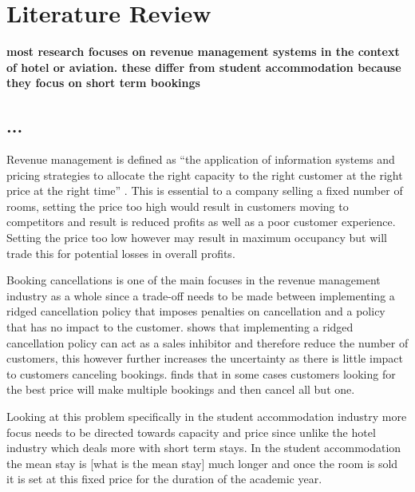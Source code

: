 \chapter{Literature Review}
\label{ch:lit_rev}

\textbf{most research focuses on revenue management systems in the context of hotel or aviation. these differ from student accommodation because they focus on short term bookings}

\section{...}
Revenue management is defined as “the application of information systems and pricing strategies to allocate the right capacity to the right customer at the right price at the right time” \cite{Kimes2003HasAcceptable}. This is essential to a company selling a fixed number of rooms, setting the price too high would result in customers  moving to competitors and result is reduced profits as well as a poor customer experience. Setting the price too low however may result in maximum occupancy but will trade this for potential losses in overall profits.

\vspace{5mm}

Booking cancellations is one of the main focuses in the revenue management industry as a whole \cite{Subramanian1999AirlineNo-shows} since a trade-off needs to be made between implementing a ridged cancellation policy that imposes penalties on cancellation and a policy that has no impact to the customer. \cite{Jinhong2007ServiceCancellations} shows that implementing a ridged cancellation policy can act as a sales inhibitor and therefore reduce the number of customers, this however further increases the uncertainty as there is little impact to customers canceling bookings. \cite{Talluri2004TheManagement} finds that in some cases customers looking for the best price will make multiple bookings and then cancel all but one. 

\vspace{5mm}

Looking at this problem specifically in the student accommodation industry more focus needs to be directed towards capacity and price since unlike the hotel industry which deals more with short term stays. In the student accommodation the mean stay is [what is the mean stay] much longer and once the room is sold it is set at this fixed price for the duration of the academic year.
 \vspace{5mm}
 
